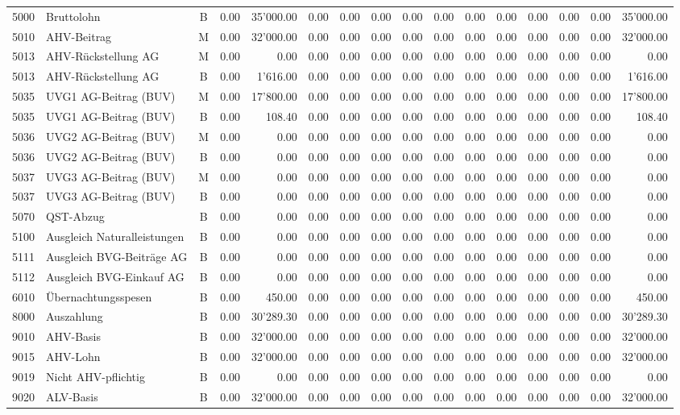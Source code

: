 \documentclass[8pt,a4paper]{extarticle}
\begin{document}
\begin{longtable}{@{\extracolsep{\fill}} l l c r r r r r r r r r r r r r}
5000&Bruttolohn&B&0.00&35'000.00&0.00&0.00&0.00&0.00&0.00&0.00&0.00&0.00&0.00&0.00&35'000.00\\
5010&AHV-Beitrag&M&0.00&32'000.00&0.00&0.00&0.00&0.00&0.00&0.00&0.00&0.00&0.00&0.00&32'000.00\\
5013&AHV-Rückstellung AG&M&0.00&0.00&0.00&0.00&0.00&0.00&0.00&0.00&0.00&0.00&0.00&0.00&0.00\\
5013&AHV-Rückstellung AG&B&0.00&1'616.00&0.00&0.00&0.00&0.00&0.00&0.00&0.00&0.00&0.00&0.00&1'616.00\\
5035&UVG1 AG-Beitrag (BUV)&M&0.00&17'800.00&0.00&0.00&0.00&0.00&0.00&0.00&0.00&0.00&0.00&0.00&17'800.00\\
5035&UVG1 AG-Beitrag (BUV)&B&0.00&108.40&0.00&0.00&0.00&0.00&0.00&0.00&0.00&0.00&0.00&0.00&108.40\\
5036&UVG2 AG-Beitrag (BUV)&M&0.00&0.00&0.00&0.00&0.00&0.00&0.00&0.00&0.00&0.00&0.00&0.00&0.00\\
5036&UVG2 AG-Beitrag (BUV)&B&0.00&0.00&0.00&0.00&0.00&0.00&0.00&0.00&0.00&0.00&0.00&0.00&0.00\\
5037&UVG3 AG-Beitrag (BUV)&M&0.00&0.00&0.00&0.00&0.00&0.00&0.00&0.00&0.00&0.00&0.00&0.00&0.00\\
5037&UVG3 AG-Beitrag (BUV)&B&0.00&0.00&0.00&0.00&0.00&0.00&0.00&0.00&0.00&0.00&0.00&0.00&0.00\\
5070&QST-Abzug&B&0.00&0.00&0.00&0.00&0.00&0.00&0.00&0.00&0.00&0.00&0.00&0.00&0.00\\
5100&Ausgleich Naturalleistungen&B&0.00&0.00&0.00&0.00&0.00&0.00&0.00&0.00&0.00&0.00&0.00&0.00&0.00\\
5111&Ausgleich BVG-Beiträge AG&B&0.00&0.00&0.00&0.00&0.00&0.00&0.00&0.00&0.00&0.00&0.00&0.00&0.00\\
5112&Ausgleich BVG-Einkauf AG&B&0.00&0.00&0.00&0.00&0.00&0.00&0.00&0.00&0.00&0.00&0.00&0.00&0.00\\
6010&Übernachtungsspesen&B&0.00&450.00&0.00&0.00&0.00&0.00&0.00&0.00&0.00&0.00&0.00&0.00&450.00\\
8000&Auszahlung&B&0.00&30'289.30&0.00&0.00&0.00&0.00&0.00&0.00&0.00&0.00&0.00&0.00&30'289.30\\
9010&AHV-Basis&B&0.00&32'000.00&0.00&0.00&0.00&0.00&0.00&0.00&0.00&0.00&0.00&0.00&32'000.00\\
9015&AHV-Lohn&B&0.00&32'000.00&0.00&0.00&0.00&0.00&0.00&0.00&0.00&0.00&0.00&0.00&32'000.00\\
9019&Nicht AHV-pflichtig&B&0.00&0.00&0.00&0.00&0.00&0.00&0.00&0.00&0.00&0.00&0.00&0.00&0.00\\
9020&ALV-Basis&B&0.00&32'000.00&0.00&0.00&0.00&0.00&0.00&0.00&0.00&0.00&0.00&0.00&32'000.00\\

\end{longtable}
\end{document}
